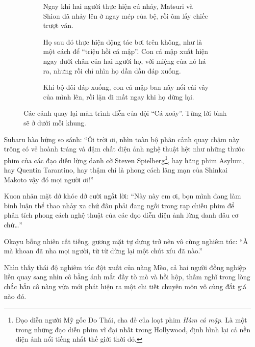 \documentclass[../main.tex]{subfiles}
\begin{document}
\begin{figure}[H]
  \centering
  \begin{subfigure}[t]{0.45\textwidth}
    \centering
    \caption{Ngay khi hai người thực hiện cú nhảy, Matsuri và Shion đã nhảy lên ở ngay mép của bệ, rồi ôm lấy chiếc trượt ván.}
  \end{subfigure}
  \quad
  \begin{subfigure}[t]{0.45\textwidth}
    \centering
    \caption{Họ sau đó thực hiện động tác bơi trên không, như là một cách để ``triệu hồi cá mập''. Con cá mập xuất hiện ngay dưới chân của hai người họ, với miệng của nó há ra, nhưng rồi chỉ nhìn họ dần dần đáp xuống.}
  \end{subfigure}
  \quad
  \begin{subfigure}[t]{0.45\textwidth}
    \centering
    \caption{Khi bộ đôi đáp xuống, con cá mập ban nãy nổi cái vây của mình lên, rồi lặn đi mất ngay khi họ dừng lại.}
  \end{subfigure}
  \caption{Các cảnh quay lại màn trình diễn của đội ``Cá xoáy''. Từng lời bình sẽ ở dưới mỗi khung.}
\end{figure}


Subaru hào hứng so sánh: ``Ôi trời ơi, nhìn toàn bộ phân cảnh quay chậm này trông có vẻ hoành tráng và đậm chất điện ảnh nghệ thuật hệt như những thước phim của các đạo diễn lừng danh cỡ Steven Spielberg\footnote{Đạo diễn người Mỹ gốc Do Thái, cha đẻ của loạt phim \textit{Hàm cá mập}. Là một trong những đạo diễn phim vĩ đại nhất trong Hollywood, định hình lại cả nền điện ảnh nổi tiếng nhất thế giới thời đó.}, hay hãng phim Asylum, hay Quentin Tarantino, hay thậm chí là phong cách lãng mạn của Shinkai Makoto vậy đó mọi người ơi!''

Kuon nhăn mặt dở khóc dở cười ngắt lời: ``Này này em ơi, bọn mình đang làm bình luận thể thao nhảy xa chứ đâu phải đang ngồi trong rạp chiếu phim để phân tích phong cách nghệ thuật của các đạo diễn điện ảnh lừng danh đâu cơ chứ\dots''

Okayu bỗng nhiên cất tiếng, gương mặt tự dưng trở nên vô cùng nghiêm túc: ``À mà khoan đã nha mọi người, từ từ dừng lại một chút xíu đã nào.''

Nhìn thấy thái độ nghiêm túc đột xuất của nàng Mèo, cả hai người đồng nghiệp liền quay sang nhìn cô bằng ánh mắt đầy tò mò và hồi hộp, thầm nghĩ trong lòng chắc hẳn cô nàng vừa mới phát hiện ra một chi tiết chuyên môn vô cùng đắt giá nào đó.
\end{document}
